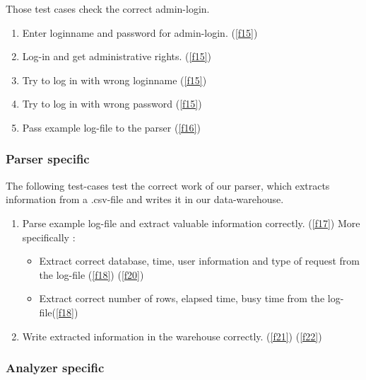 Those test cases check the correct admin-login.

\begin{enumerate}[resume]

\item Enter loginname and password for admin-login. (\ref{f15})

\item Log-in and get administrative rights. (\ref{f15})

\item Try to log in with wrong loginname (\ref{f15})

\item Try to log in with wrong password (\ref{f15})

\item Pass example log-file to the parser (\ref{f16})

\end{enumerate}

\subsubsection{Parser specific}

The following test-cases test the correct work of our parser, which extracts information from a .csv-file and writes 
it in our data-warehouse.

\begin{enumerate}[resume]

\item Parse example log-file and extract valuable information correctly. (\ref{f17}) More specifically :

\begin{itemize}

\item Extract correct database, time, user information and type of request from the log-file (\ref{f18}) (\ref{f20})

\item Extract correct number of rows, elapsed time, busy time from the log-file(\ref{f18})

\end{itemize}

\item Write extracted information in the warehouse correctly. (\ref{f21}) (\ref{f22})

\end{enumerate}


\subsubsection{Analyzer specific}

